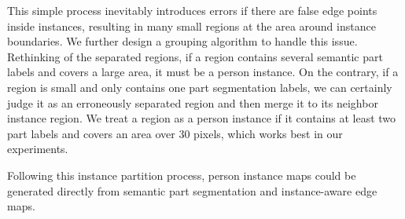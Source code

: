 \documentclass[runningheads]{llncs}
\begin{document}
This simple process inevitably introduces errors if there are false edge points inside instances, resulting in many small regions at the area around instance boundaries. We further design a grouping algorithm to handle this issue. Rethinking of the separated regions, if a region contains several semantic part labels and covers a large area, it must be a person instance. On the contrary, if a region is small and only contains one part segmentation labels, we can certainly judge it as an erroneously separated region and then merge it to its neighbor instance region. We treat a region as a person instance if it contains at least two part labels and covers an area over 30 pixels, which works best in our experiments. 

Following this instance partition process, person instance maps could be generated directly from semantic part segmentation and instance-aware edge maps. 
\end{document}
